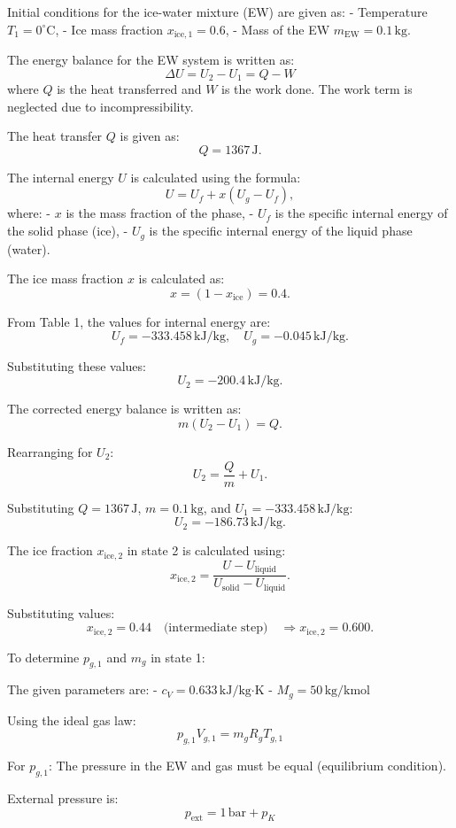 Initial conditions for the ice-water mixture (EW) are given as:
- Temperature \( T_1 = 0^\circ\text{C} \),
- Ice mass fraction \( x_{\text{ice},1} = 0.6 \),
- Mass of the EW \( m_{\text{EW}} = 0.1 \, \text{kg} \).

The energy balance for the EW system is written as:
\[
\Delta U = U_2 - U_1 = Q - W
\]
where \( Q \) is the heat transferred and \( W \) is the work done. The work term is neglected due to incompressibility.

The heat transfer \( Q \) is given as:
\[
Q = 1367 \, \text{J}.
\]

The internal energy \( U \) is calculated using the formula:
\[
U = U_f + x (U_g - U_f),
\]
where:
- \( x \) is the mass fraction of the phase,
- \( U_f \) is the specific internal energy of the solid phase (ice),
- \( U_g \) is the specific internal energy of the liquid phase (water).

The ice mass fraction \( x \) is calculated as:
\[
x = (1 - x_{\text{ice}}) = 0.4.
\]

From Table 1, the values for internal energy are:
\[
U_f = -333.458 \, \text{kJ/kg}, \quad U_g = -0.045 \, \text{kJ/kg}.
\]

Substituting these values:
\[
U_2 = -200.4 \, \text{kJ/kg}.
\]

The corrected energy balance is written as:
\[
m (U_2 - U_1) = Q.
\]

Rearranging for \( U_2 \):
\[
U_2 = \frac{Q}{m} + U_1.
\]

Substituting \( Q = 1367 \, \text{J} \), \( m = 0.1 \, \text{kg} \), and \( U_1 = -333.458 \, \text{kJ/kg} \):
\[
U_2 = -186.73 \, \text{kJ/kg}.
\]

The ice fraction \( x_{\text{ice},2} \) in state 2 is calculated using:
\[
x_{\text{ice},2} = \frac{U - U_{\text{liquid}}}{U_{\text{solid}} - U_{\text{liquid}}}.
\]

Substituting values:
\[
x_{\text{ice},2} = 0.44 \quad \text{(intermediate step)} \quad \Rightarrow x_{\text{ice},2} = 0.600.
\]

To determine \( p_{g,1} \) and \( m_g \) in state 1:  

The given parameters are:  
- \( c_V = 0.633 \, \text{kJ/kg·K} \)  
- \( M_g = 50 \, \text{kg/kmol} \)  

Using the ideal gas law:  
\[
p_{g,1} V_{g,1} = m_g R_g T_{g,1}
\]  

For \( p_{g,1} \): The pressure in the EW and gas must be equal (equilibrium condition).  

External pressure is:  
\[
p_{\text{ext}} = 1 \, \text{bar} + p_K
\]  

